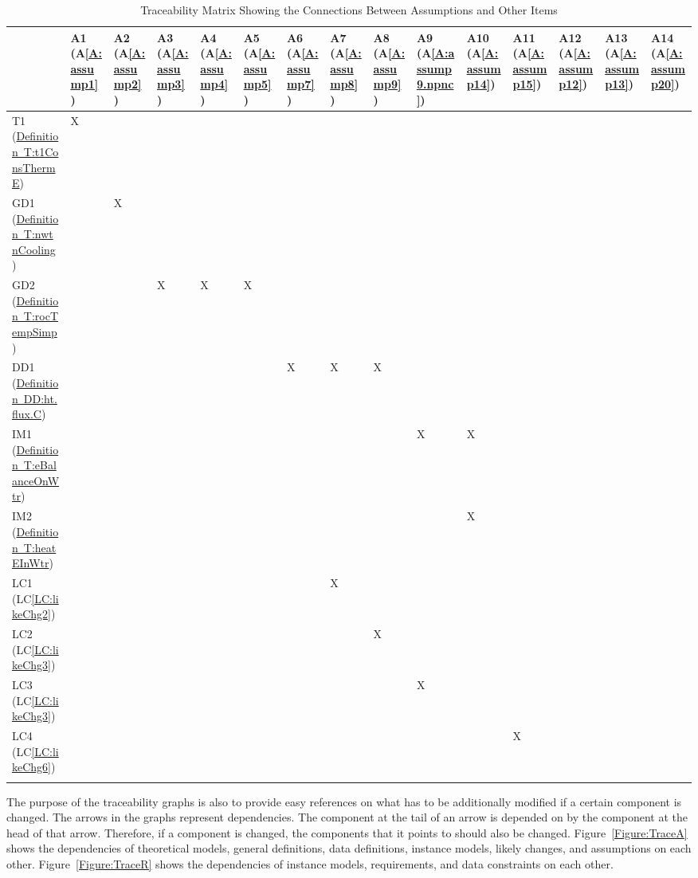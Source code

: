 \documentclass[12pt]{article}
\begin{document}
\begin{longtable}{l l l l l l l l l l l l l l l}
\toprule
 & A1 (A\ref{A:assump1}) & A2 (A\ref{A:assump2}) & A3 (A\ref{A:assump3}) & A4 (A\ref{A:assump4}) & A5 (A\ref{A:assump5}) & A6 (A\ref{A:assump7}) & A7 (A\ref{A:assump8}) & A8 (A\ref{A:assump9}) & A9 (A\ref{A:assump9.npnc}) & A10 (A\ref{A:assump14}) & A11 (A\ref{A:assump15}) & A12 (A\ref{A:assump12}) & A13 (A\ref{A:assump13}) & A14 (A\ref{A:assump20})
\\
\midrule
T1 (\hyperref[T:t1ConsThermE]{Definition~T:t1ConsThermE}) & X &  &  &  &  &  &  &  &  &  &  &  &  & 
\\
GD1 (\hyperref[T:nwtnCooling]{Definition~T:nwtnCooling}) &  & X &  &  &  &  &  &  &  &  &  &  &  & 
\\
GD2 (\hyperref[T:rocTempSimp]{Definition~T:rocTempSimp}) &  &  & X & X & X &  &  &  &  &  &  &  &  & 
\\
DD1 (\hyperref[DD:ht.flux.C]{Definition~DD:ht.flux.C}) &  &  &  &  &  & X & X & X &  &  &  &  &  & 
\\
IM1 (\hyperref[T:eBalanceOnWtr]{Definition~T:eBalanceOnWtr}) &  &  &  &  &  &  &  &  & X & X &  &  &  & 
\\
IM2 (\hyperref[T:heatEInWtr]{Definition~T:heatEInWtr}) &  &  &  &  &  &  &  &  &  & X &  &  &  & 
\\
LC1 (LC\ref{LC:likeChg2}) &  &  &  &  &  &  & X &  &  &  &  &  &  & 
\\
LC2 (LC\ref{LC:likeChg3}) &  &  &  &  &  &  &  & X &  &  &  &  &  & 
\\
LC3 (LC\ref{LC:likeChg3}) &  &  &  &  &  &  &  &  & X &  &  &  &  & 
\\
LC4 (LC\ref{LC:likeChg6}) &  &  &  &  &  &  &  &  &  &  & X &  &  & 
\\
\bottomrule
\caption{Traceability Matrix Showing the Connections Between Assumptions and Other Items}
\label{Table:TraceyAI}
\end{longtable}
The purpose of the traceability graphs is also to provide easy references on what has to be additionally modified if a certain component is changed. The arrows in the graphs represent dependencies. The component at the tail of an arrow is depended on by the component at the head of that arrow. Therefore, if a component is changed, the components that it points to should also be changed. Figure~\ref{Figure:TraceA} shows the dependencies of theoretical models, general definitions, data definitions, instance models, likely changes, and assumptions on each other. Figure~\ref{Figure:TraceR} shows the dependencies of instance models, requirements, and data constraints on each other.
\end{document}
